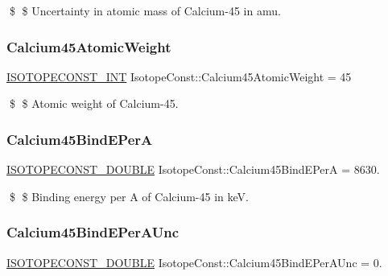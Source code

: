\$ \$ Uncertainty in atomic mass of Calcium-\/45 in amu. \mbox{\label{group___isotope_const-_calcium-_ca45_ga7fb2520e9e2c5a133c4ae7015c578973}} 
\subsubsection{\texorpdfstring{Calcium45\+Atomic\+Weight}{Calcium45AtomicWeight}}
{\footnotesize\ttfamily \mbox{\hyperlink{group___isotope_const-_macros_ga5f18360b3e99483a35c32d789e62621c}{I\+S\+O\+T\+O\+P\+E\+C\+O\+N\+S\+T\+\_\+\+I\+NT}} Isotope\+Const\+::\+Calcium45\+Atomic\+Weight = 45}

\$ \$ Atomic weight of Calcium-\/45. \mbox{\label{group___isotope_const-_calcium-_ca45_ga827b76b53753f7f6231041aef8037575}} 
\subsubsection{\texorpdfstring{Calcium45\+Bind\+E\+PerA}{Calcium45BindEPerA}}
{\footnotesize\ttfamily \mbox{\hyperlink{group___isotope_const-_macros_ga8f45a7272ce02c0b4c65c44636ed719a}{I\+S\+O\+T\+O\+P\+E\+C\+O\+N\+S\+T\+\_\+\+D\+O\+U\+B\+LE}} Isotope\+Const\+::\+Calcium45\+Bind\+E\+PerA = 8630.}

\$ \$ Binding energy per A of Calcium-\/45 in keV. \mbox{\label{group___isotope_const-_calcium-_ca45_ga40bd50cb269fb76a43031d2e70fc1acc}} 
\subsubsection{\texorpdfstring{Calcium45\+Bind\+E\+Per\+A\+Unc}{Calcium45BindEPerAUnc}}
{\footnotesize\ttfamily \mbox{\hyperlink{group___isotope_const-_macros_ga8f45a7272ce02c0b4c65c44636ed719a}{I\+S\+O\+T\+O\+P\+E\+C\+O\+N\+S\+T\+\_\+\+D\+O\+U\+B\+LE}} Isotope\+Const\+::\+Calcium45\+Bind\+E\+Per\+A\+Unc = 0.}


